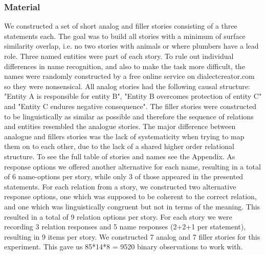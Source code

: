 \documentclass[a4paper,man,natbib,floatsintext,import]{apa6}
\begin{document}
\subsubsection{Material}
We constructed a set of short analog and filler stories consisting of a three statements each. The goal was to build all stories with a minimum of surface similarity overlap, i.e. no two stories with animals or where plumbers have a lead role. Three named entities were part of each story. To rule out individual differences in name recognition, and also to make the task more difficult, the names were randomly constructed by a free online service on dialectcreator.com so they were nonsensical. All analog stories had the following causal structure: "Entity A is responsible for entity B", "Entity B overcomes protection of entity C" and "Entity C endures negative consequence". The filler stories were constructed to be linguistically as similar as possible and therefore the sequence of relations and entities resembled the analogue stories. The major difference between analogue and fillers stories was the lack of systematicity when trying to map them on to each other, due to the lack of a shared higher order relational structure. To see the full table of stories and names see the Appendix.
As response options we offered  another alternative for each name, resulting in a total of 6 name-options per story, while only 3 of those appeared in the presented statements. For each relation from a story, we constructed two alternative response options, one which was supposed to be coherent to the correct relation, and one which was linguistically congruent but not in terms of the meaning. This resulted in a total of 9 relation options per story.
For each story we were recording 3 relation responses and 5 name responses (2+2+1 per statement), resulting in 9 items per story. We constructed 7 analog and 7 filler stories for this experiment. This gave us 85*14*8 = 9520 binary observations to work with.
\end{document}
